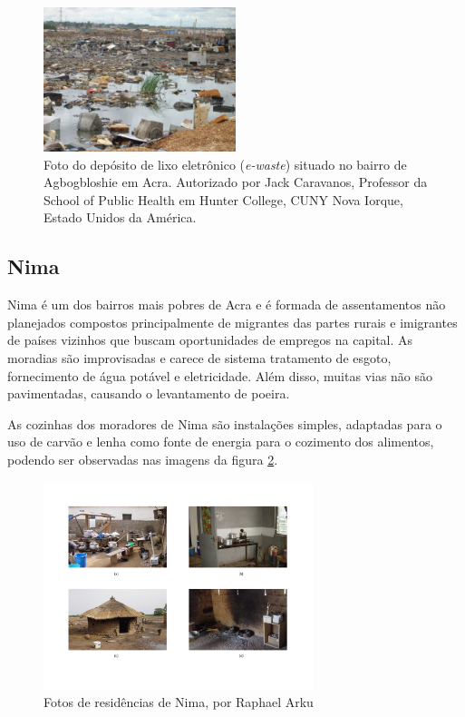 \begin{figure}[H]
  \centering
  \includegraphics[width=0.5\textwidth]{../inputs/images/ewaste_jack_caravano.jpg}
  \caption{Foto do depósito de lixo eletrônico (\textit{e-waste}) situado no bairro 
           de Agbogbloshie em Acra. Autorizado por Jack Caravanos, 
           Professor da School of Public Health em Hunter College, CUNY
           Nova Iorque, Estado Unidos da América. \label{fig:ewaste}}
\end{figure}

\subsection{Nima}

Nima é um dos bairros mais pobres de Acra e é formada de assentamentos não 
planejados compostos principalmente de migrantes das partes rurais e 
imigrantes de países vizinhos que buscam oportunidades de empregos na capital. 
As moradias são improvisadas e carece de sistema tratamento de esgoto, 
fornecimento de água potável e eletricidade. Além disso, muitas vias não são 
pavimentadas, causando o levantamento de poeira. 



As cozinhas dos moradores de Nima são instalações simples, adaptadas para o uso
de carvão e lenha como fonte de energia para o cozimento dos alimentos, 
podendo ser observadas nas imagens da figura \ref{fig:nima}.

\begin{figure}[H]
  \centering
    \includegraphics[width=0.7\textwidth]{../inputs/images/zheng/nima.pdf}
    \caption{Fotos de residências de Nima, por Raphael Arku \label{fig:nima}}
\end{figure}
